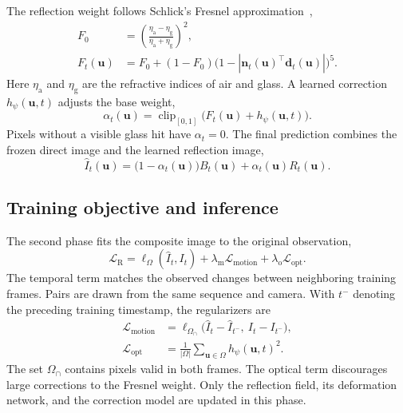 The reflection weight follows Schlick's Fresnel approximation~\cite{schlick1994},
\begin{equation}
  \begin{aligned}
    F_0 &= \left(\frac{\eta_{\mathrm{a}}-\eta_{\mathrm{g}}}
                         {\eta_{\mathrm{a}}+\eta_{\mathrm{g}}}\right)^2,\\
    F_t(\mathbf{u})
      &= F_0+(1-F_0)
         \bigl(1-|\mathbf{n}_t(\mathbf{u})^{\top}\mathbf{d}_t(\mathbf{u})|\bigr)^5.
  \end{aligned}
  \label{eq:fresnel-weight}
\end{equation}
Here $\eta_{\mathrm{a}}$ and $\eta_{\mathrm{g}}$ are the refractive indices of air and glass. A learned correction $h_{\psi}(\mathbf{u},t)$ adjusts the base weight,
\begin{equation}
  \alpha_t(\mathbf{u})
    = \operatorname{clip}_{[0,1]}
      \bigl(F_t(\mathbf{u})+h_{\psi}(\mathbf{u},t)\bigr).
  \label{eq:adjusted-weight}
\end{equation}
Pixels without a visible glass hit have $\alpha_t=0$. The final prediction combines the frozen direct image and the learned reflection image,
\begin{equation}
  \widehat{I}_t(\mathbf{u})
    = \bigl(1-\alpha_t(\mathbf{u})\bigr)B_t(\mathbf{u})
      + \alpha_t(\mathbf{u})R_t(\mathbf{u}).
  \label{eq:composite-image}
\end{equation}

\subsection{Training objective and inference}
The second phase fits the composite image to the original observation,
\begin{equation}
  \mathcal{L}_{\mathrm{R}}
    = \ell_{\Omega}(\widehat{I}_t,I_t)
      + \lambda_{\mathrm{m}}\mathcal{L}_{\mathrm{motion}}
      + \lambda_{\mathrm{o}}\mathcal{L}_{\mathrm{opt}}.
  \label{eq:reflection-objective}
\end{equation}
The temporal term matches the observed changes between neighboring training frames. Pairs are drawn from the same sequence and camera. With $t^{-}$ denoting the preceding training timestamp, the regularizers are
\begin{equation}
  \begin{aligned}
    \mathcal{L}_{\mathrm{motion}}
      &= \ell_{\Omega_{\cap}}
         \bigl(\widehat{I}_t-\widehat{I}_{t^{-}},\ I_t-I_{t^{-}}\bigr),\\
    \mathcal{L}_{\mathrm{opt}}
      &= \frac{1}{|\Omega|}\sum_{\mathbf{u}\in\Omega}
          h_{\psi}(\mathbf{u},t)^2.
  \end{aligned}
  \label{eq:reflection-regularizers}
\end{equation}
The set $\Omega_{\cap}$ contains pixels valid in both frames. The optical term discourages large corrections to the Fresnel weight. Only the reflection field, its deformation network, and the correction model are updated in this phase.

